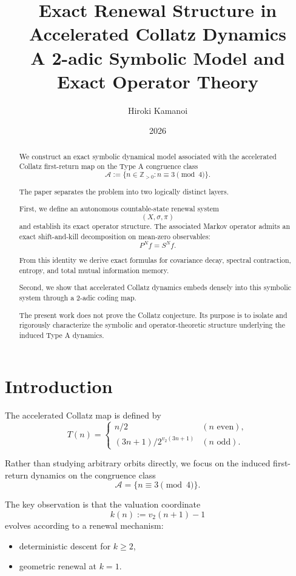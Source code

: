 \documentclass[11pt]{article}
\title{
Exact Renewal Structure in Accelerated Collatz Dynamics\\
\large A 2-adic Symbolic Model and Exact Operator Theory
}
\author{Hiroki Kamanoi}
\date{2026}
\begin{document}
\maketitle

\begin{abstract}
We construct an exact symbolic dynamical model associated with the accelerated
Collatz first-return map on the Type A congruence class
\[
\mathcal A := \{n\in\mathbb Z_{>0}: n\equiv3\pmod4\}.
\]

The paper separates the problem into two logically distinct layers.

First, we define an autonomous countable-state renewal system
\[
(X,\sigma,\pi)
\]
and establish its exact operator structure. The associated Markov operator
admits an exact shift-and-kill decomposition on mean-zero observables:
\[
P^Nf=S^Nf.
\]

From this identity we derive exact formulas for covariance decay,
spectral contraction, entropy, and total mutual information memory.

Second, we show that accelerated Collatz dynamics embeds densely into this
symbolic system through a 2-adic coding map.

The present work does not prove the Collatz conjecture. Its purpose is to
isolate and rigorously characterize the symbolic and operator-theoretic
structure underlying the induced Type A dynamics.
\end{abstract}

\tableofcontents

\section{Introduction}

The accelerated Collatz map is defined by
\[
T(n)=
\begin{cases}
n/2 & (n \text{ even}),\\
(3n+1)/2^{v_2(3n+1)} & (n \text{ odd}).
\end{cases}
\]

Rather than studying arbitrary orbits directly, we focus on the induced
first-return dynamics on the congruence class
\[
\mathcal A=\{n\equiv3\pmod4\}.
\]

The key observation is that the valuation coordinate
\[
k(n):=v_2(n+1)-1
\]
evolves according to a renewal mechanism:
\begin{itemize}
\item deterministic descent for \(k\ge2\),
\item geometric renewal at \(k=1\).
\end{itemize}
\end{document}
